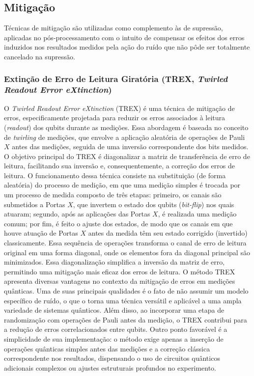\subsection{Mitigaç\~{a}o}
\label{subSec: mitigacao}

T\'{e}cnicas de mitigaç\~{a}o s\~{a}o utilizadas como complemento às de supress\~{a}o, aplicadas no pós-processamento com o intuito de compensar os efeitos dos erros induzidos nos resultados medidos pela aç\~{a}o do ru\'{i}do que n\~{a}o pôde ser totalmente cancelado na supress\~{a}o.

\subsubsection*{Extinç\~{a}o de Erro de Leitura Giratória (TREX, \textit{Twirled Readout Error eXtinction})}
\label{subSubSec: trex}

O \textit{Twirled Readout Error eXtinction} (TREX) \'{e} uma t\'{e}cnica de mitigaç\~{a}o de erros, especificamente projetada para reduzir os erros associados à leitura (\textit{readout}) dos qubits durante as mediç\~{o}es. Essa abordagem \'{e} baseada no conceito de \textit{twirling} de mediç\~{o}es, que envolve a aplicaç\~{a}o aleatória de operaç\~{o}es de Pauli $X$ antes das mediç\~{o}es, seguida de uma invers\~{a}o correspondente dos bits medidos. O objetivo principal do TREX \'{e} diagonalizar a matriz de transfer\^{e}ncia de erro de leitura, facilitando sua invers\~{a}o e, consequentemente, a correç\~{a}o dos erros de leitura.
O funcionamento dessa t\'{e}cnica consiste na substituiç\~{a}o (de forma aleatória) do processo de mediç\~{a}o, em que uma mediç\~{a}o simples \'{e} trocada por um processo de medida composto de tr\^{e}s etapas: primeiro, os canais s\~{a}o submetidos a Portas $X$, que invertem o estado dos qubits (\textit{bit-flip}) nos quais atuaram; segundo, após as aplicaç\~{o}es das Portas $X$, \'{e} realizada uma mediç\~{a}o comum; por fim, \'{e} feito o ajuste dos estados, de modo que os canais em que houve atuaç\~{a}o de Portas $X$ antes da medida t\^{e}m seu estado corrigido (invertido) classicamente.
Essa sequ\^{e}ncia de operaç\~{o}es transforma o canal de erro de leitura original em uma forma diagonal, onde os elementos fora da diagonal principal s\~{a}o minimizados. Essa diagonalizaç\~{a}o simplifica a invers\~{a}o da matriz de erro, permitindo uma mitigaç\~{a}o mais eficaz dos erros de leitura.
O m\'{e}todo TREX apresenta diversas vantagens no contexto da mitigaç\~{a}o de erros em mediç\~{o}es qu\^{a}nticas. Uma de suas principais qualidades \'{e} o fato de n\~{a}o assumir um modelo espec\'{i}fico de ru\'{i}do, o que o torna uma t\'{e}cnica vers\'{a}til e aplic\'{a}vel a uma ampla variedade de sistemas qu\^{a}nticos. Al\'{e}m disso, ao incorporar uma etapa de randomizaç\~{a}o com operaç\~{o}es de Pauli antes da mediç\~{a}o, o TREX contribui para a reduç\~{a}o de erros correlacionados entre qubits. Outro ponto favor\'{a}vel \'{e} a simplicidade de sua implementaç\~{a}o: o m\'{e}todo exige apenas a inserç\~{a}o de operaç\~{o}es qu\^{a}nticas simples antes das mediç\~{o}es e a correç\~{a}o cl\'{a}ssica correspondente nos resultados, dispensando o uso de circuitos qu\^{a}nticos adicionais complexos ou ajustes estruturais profundos no experimento.

